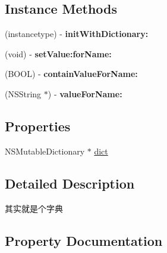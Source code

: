 \subsection*{Instance Methods}
\begin{DoxyCompactItemize}
\item 
\mbox{\label{interface_app_monitor_dimension_value_set_a40fa750f114276095b23eaedc468c7ce}} 
(instancetype) -\/ {\bfseries init\+With\+Dictionary\+:}
\item 
\mbox{\label{interface_app_monitor_dimension_value_set_a5098119800563b4901a3b0e119bb2d74}} 
(void) -\/ {\bfseries set\+Value\+:for\+Name\+:}
\item 
\mbox{\label{interface_app_monitor_dimension_value_set_a29be3c348bcb2c428d267c8e59b204e2}} 
(B\+O\+OL) -\/ {\bfseries contain\+Value\+For\+Name\+:}
\item 
\mbox{\label{interface_app_monitor_dimension_value_set_a258e379308d9fd44f1b3d03643c83a82}} 
(N\+S\+String $\ast$) -\/ {\bfseries value\+For\+Name\+:}
\end{DoxyCompactItemize}
\subsection*{Properties}
\begin{DoxyCompactItemize}
\item 
N\+S\+Mutable\+Dictionary $\ast$ \mbox{\hyperlink{interface_app_monitor_dimension_value_set_ae7e53d8785293320457b2490f9186870}{dict}}
\end{DoxyCompactItemize}


\subsection{Detailed Description}
其实就是个字典 

\subsection{Property Documentation}
\mbox{\label{interface_app_monitor_dimension_value_set_ae7e53d8785293320457b2490f9186870}} 

